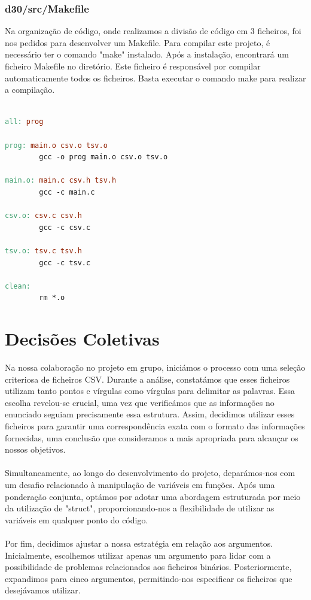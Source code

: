 \documentclass[a4wide]{report}
\begin{document}
\subsection{d30/src/Makefile}
Na organização de código, onde realizamos a divisão de código em 3 ficheiros, foi nos pedidos para desenvolver um Makefile.  Para compilar este projeto, é necessário ter o comando "make" instalado. Após a instalação, encontrará um ficheiro Makefile no diretório. Este ficheiro é responsável por compilar automaticamente todos os ficheiros. Basta executar o comando make para realizar a compilação.
\\
\begin{lstlisting}[xleftmargin=7em, xrightmargin=7em,language=make, caption={Código Makefile}, label={codigo:makefile}]

all: prog

prog: main.o csv.o tsv.o
        gcc -o prog main.o csv.o tsv.o

main.o: main.c csv.h tsv.h
        gcc -c main.c

csv.o: csv.c csv.h
        gcc -c csv.c

tsv.o: tsv.c tsv.h
        gcc -c tsv.c

clean:
        rm *.o

\end{lstlisting}
\chapter{Decisões Coletivas}
Na nossa colaboração no projeto em grupo, iniciámos o processo com uma seleção criteriosa de ficheiros CSV. Durante a análise, constatámos que esses ficheiros utilizam tanto pontos e vírgulas como vírgulas para delimitar as palavras. 
Essa escolha revelou-se crucial, uma vez que verificámos que as informações no enunciado seguiam precisamente essa estrutura. Assim, decidimos utilizar esses ficheiros para garantir uma correspondência exata com o formato das informações fornecidas, uma conclusão que consideramos a mais apropriada para alcançar os nossos objetivos.
\\
\\
Simultaneamente, ao longo do desenvolvimento do projeto, deparámos-nos com um desafio relacionado à manipulação de variáveis em funções. Após uma ponderação conjunta, optámos por adotar uma abordagem estruturada por meio da utilização de "struct", proporcionando-nos a flexibilidade de utilizar as variáveis em qualquer ponto do código.
\\
\\
Por fim, decidimos ajustar a nossa estratégia em relação aos argumentos. Inicialmente, escolhemos utilizar apenas um argumento para lidar com a possibilidade de problemas relacionados aos ficheiros binários. Posteriormente, expandimos para cinco argumentos, permitindo-nos especificar os ficheiros que desejávamos utilizar.
\end{document}
